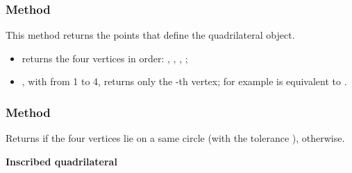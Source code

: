 \subsubsection{Method }
\label{ssub:method_quadrilateral_get}

This method returns the points that define the quadrilateral object.

\begin{itemize}
  \item {} returns the four vertices in order: , , , ;
  \item {}, with  from 1 to 4, returns only the
        -th vertex; for example  is equivalent to .
\end{itemize}

\begin{tkzexample}
\end{tkzexample}

\subsubsection{Method }
\label{ssub:iscyclic}

Returns  if the four vertices lie on a same circle (with the tolerance ),  otherwise.

\textbf{Inscribed quadrilateral}

